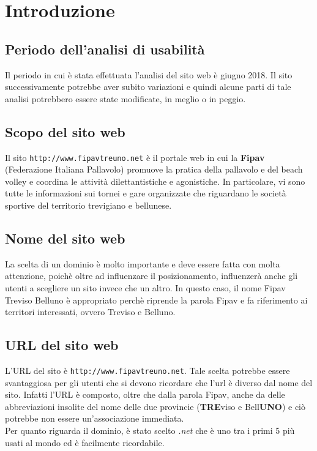 \section{Introduzione}
	\subsection{Periodo dell'analisi di usabilità}
	Il periodo in cui è stata effettuata l’analisi del sito web è giugno 2018.
	Il sito successivamente potrebbe aver subito variazioni e quindi alcune parti
	di tale analisi potrebbero essere state modificate, in meglio o in peggio.

	\subsection{Scopo del sito web}
	Il sito \texttt{http://www.fipavtreuno.net} è il portale web in cui la 
	\textbf{Fipav} (Federazione Italiana Pallavolo) promuove la pratica della
	pallavolo e del beach volley e coordina le attività dilettantistiche e 
	agonistiche. In particolare, vi sono tutte le informazioni sui tornei e gare
	organizzate 	che riguardano le società sportive del territorio trevigiano e
	bellunese.

	\subsection{Nome del sito web}
	La scelta di un dominio è  molto importante e deve essere fatta con molta
	attenzione, poichè oltre ad influenzare il posizionamento, influenzerà anche gli
	utenti a scegliere un sito invece che un altro. In questo caso, il nome Fipav
	Treviso Belluno è appropriato perchè riprende la parola Fipav e fa riferimento ai
	territori interessati, ovvero Treviso e Belluno.
	
	\subsection{URL del sito web}
	L'URL del sito è \texttt{http://www.fipavtreuno.net}. Tale scelta potrebbe essere
	svantaggiosa per gli utenti che si devono ricordare che l'url è diverso dal
	nome del sito. Infatti l'URL è composto, oltre che dalla parola Fipav, anche da
	delle abbreviazioni insolite del nome delle due provincie (\textbf{TRE}viso e
	Bell\textbf{UNO}) e ciò potrebbe non essere un'associazione immediata. \\
	Per quanto riguarda il dominio, è stato scelto \textit{.net} che è uno tra i primi
	5 più usati al mondo ed è facilmente ricordabile.
	
	

